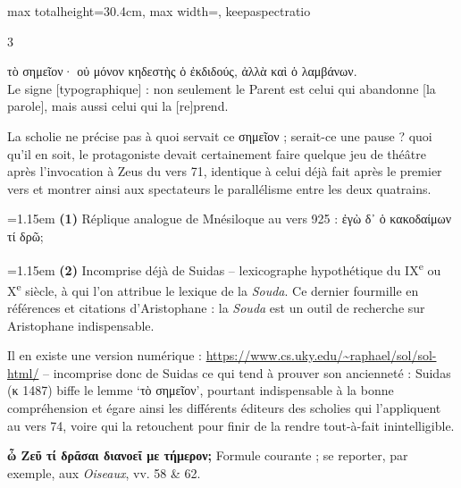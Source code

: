 \documentclass[11pt,twoside]{book}
\newcommand{\italique}[1]{\textit{#1}}
\newcommand{\citComm}[1]{\begin{quoting}[vskip=0.4pt,leftmargin=0.7em,rightmargin=0.2em]#1\end{quoting}}
\newcommand{\nieme}[1]{#1\textsuperscript{e}}
\newcommand{\francais}[1]{{\policeFr #1}}
\begin{document}
\begin{adjustbox}{max totalheight=30.4cm, max width=\textwidth, keepaspectratio}
\begin{minipage}{\textwidth}
{\begin{multicols}{3}
\citComm{τὸ σημεῖον· οὐ μόνον κηδεστὴς ὁ ἐκδιδούς, ἀλλὰ καὶ ὁ λαμβάνων.\\
\francais{Le signe [typographique] : non seulement le Parent est celui qui abandonne [la parole], mais aussi celui qui la [re]prend.}}
\par\vspace{1.5pt}
\noindent La scholie ne précise pas à quoi servait ce σημεῖον ; serait-ce une pause ? quoi qu'il en soit, le protagoniste devait certainement faire quelque jeu de théâtre après l'invocation à Zeus du vers 71, identique à celui déjà fait après le premier vers et montrer ainsi aux spectateurs le parallélisme entre les deux quatrains.
\par\vspace{1.5pt}
\par\vspace{1.2pt}\par\nopagebreak\vspace{1pt}\noindent\hangindent=1.15em {\color{sepiaNote}\textbf{(1)}} Réplique analogue de Mnésiloque au vers 925 : ἐγὼ δ᾽ ὁ κακοδαίμων τί δρῶ;
\par\vspace{1.5pt}
\noindent\hangindent=1.15em {\color{sepiaNote}\textbf{(2)}} Incomprise déjà de Suidas – lexicographe hypothétique du \nieme{IX} ou \nieme{X} siècle, à qui l'on attribue le lexique de la \italique{Souda}. Ce dernier fourmille en références et citations d'Aristophane : la \italique{Souda} est un outil de recherche sur Aristophane indispensable.
\par\vspace{1.5pt}
\noindent Il en existe une version numérique : \href{https://www.cs.uky.edu/\allowbreak\textasciitilde raphael/\allowbreak sol/\allowbreak sol-html/}{https://www.cs.uky.edu/\allowbreak\textasciitilde raphael/\allowbreak sol/\allowbreak sol-html/} – incomprise donc de Suidas ce qui tend à prouver son ancienneté : Suidas (κ 1487) biffe le lemme `τὸ σημεῖον', pourtant indispensable à la bonne compréhension et égare ainsi les différents éditeurs des scholies qui l'appliquent au vers 74, voire qui la retouchent pour finir de la rendre tout-à-fait inintelligible.
\par\vspace{1.5pt}
 \textbf{ὦ Ζεῦ τί δρᾶσαι διανοεῖ με τήμερον;} Formule courante ; se reporter, par exemple, aux \italique{Oiseaux}, vv. 58 \& 62.

\end{multicols}}
\end{minipage}
\end{adjustbox}
\end{document}
